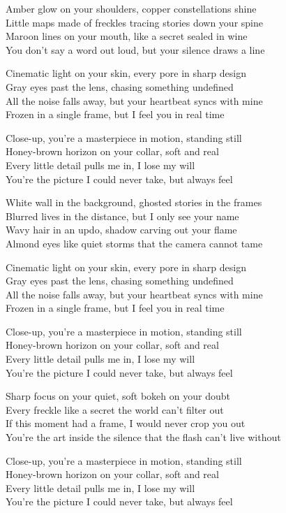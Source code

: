 \begin{lyrics}
Amber glow on your shoulders, copper constellations shine\\
Little maps made of freckles tracing stories down your spine\\
Maroon lines on your mouth, like a secret sealed in wine\\
You don’t say a word out loud, but your silence draws a line

Cinematic light on your skin, every pore in sharp design\\
Gray eyes past the lens, chasing something undefined\\
All the noise falls away, but your heartbeat syncs with mine\\
Frozen in a single frame, but I feel you in real time

Close-up, you’re a masterpiece in motion, standing still\\
Honey-brown horizon on your collar, soft and real\\
Every little detail pulls me in, I lose my will\\
You’re the picture I could never take, but always feel

White wall in the background, ghosted stories in the frames\\
Blurred lives in the distance, but I only see your name\\
Wavy hair in an updo, shadow carving out your flame\\
Almond eyes like quiet storms that the camera cannot tame

Cinematic light on your skin, every pore in sharp design\\
Gray eyes past the lens, chasing something undefined\\
All the noise falls away, but your heartbeat syncs with mine\\
Frozen in a single frame, but I feel you in real time

Close-up, you’re a masterpiece in motion, standing still\\
Honey-brown horizon on your collar, soft and real\\
Every little detail pulls me in, I lose my will\\
You’re the picture I could never take, but always feel

Sharp focus on your quiet, soft bokeh on your doubt\\
Every freckle like a secret the world can’t filter out\\
If this moment had a frame, I would never crop you out\\
You’re the art inside the silence that the flash can’t live without

Close-up, you’re a masterpiece in motion, standing still\\
Honey-brown horizon on your collar, soft and real\\
Every little detail pulls me in, I lose my will\\
You’re the picture I could never take, but always feel
\end{lyrics}

